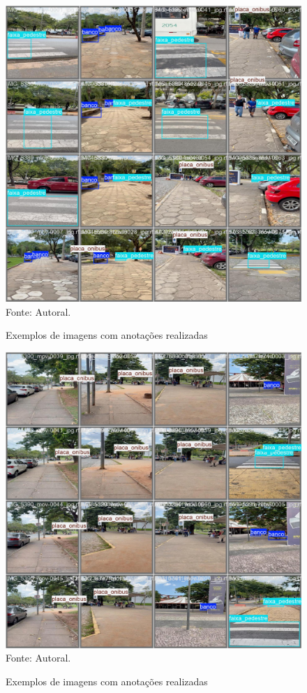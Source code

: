 \begin{figure}[htbp]
  \centering
  \caption{Exemplos de imagens com anotações realizadas}
  \includegraphics[width=1 \textwidth]{Figuras/val_batch0_labels.jpg}
  \\
  Fonte: Autoral.
  \label{fg-ex_anot1}
\end{figure}

\begin{figure}[htbp]
  \centering
  \caption{Exemplos de imagens com anotações realizadas}
  \includegraphics[width=1 \textwidth]{Figuras/val_batch1_labels.jpg}
  \\
  Fonte: Autoral.
  \label{fg-ex_anot2}
\end{figure}

